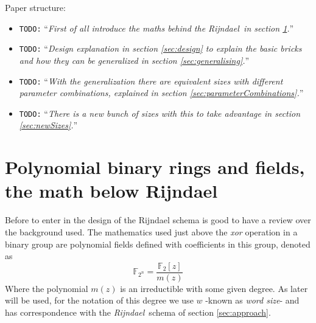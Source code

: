 \documentclass[10pt,a4paper,twoside]{llncs}
\newcommand{\todo}[1]{\texttt{\color{red}TODO:} ``\emph{#1}''}
\newcommand{\rijndael}{\emph{Rijndael}}
\newcommand{\Fpn}[2]{\ensuremath{\mathbb{F}_{#1^#2}}}
\begin{document}
Paper structure:
\begin{itemize}
 \item \todo{First of all introduce the maths behind the \rijndael\, in section \ref{sec:math}.}
 \item \todo{Design explanation in section \ref{sec:design} to explain the basic bricks and how they can be generalized in section \ref{sec:generalising}.}
 \item \todo{With the generalization there are equivalent sizes with different parameter combinations, explained in section \ref{sec:parameterCombinations}.}
 \item \todo{There is a new bunch of sizes with this to take advantage in section \ref{sec:newSizes}.}
\end{itemize}

\section{Polynomial binary rings and fields, the math below Rijndael}\label{sec:math}
Before to enter in the design of the Rijndael schema is good to have a review over the background used. The mathematics used just above the \emph{xor} operation in a binary group are polynomial fields defined with coefficients in this group, denoted as
\begin{equation}\label{eq:polynomialField} 
    \Fpn{2}{n}=\frac{\mathbb{F}_{2}[z]}{m(z)}
\end{equation}
Where the polynomial $m(z)$ is an irreductible with some given degree. As later will be used, for the notation of this degree we use $w$ -known as \emph{word size}- and has correspondence with the \rijndael\, schema of section \ref{sec:approach}.
\end{document}

